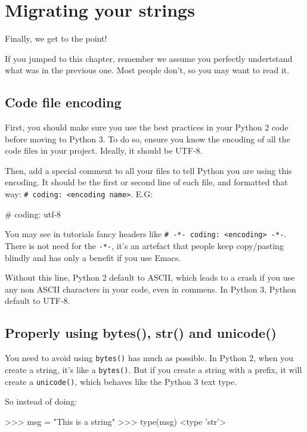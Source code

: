 
\chapter{Migrating your strings}

Finally, we get to the point!

If you jumped to this chapter, remember we assume you perfectly undertstand what was in the previous one. Most people don't, so you may want to read it.

\section{Code file encoding}

First, you should make sure you use the best practices in your Python 2 code before moving to Python 3. To do so, ensure you know the encoding of all the code files in your project. Ideally, it should be UTF-8.

Then, add a special comment to all your files to tell Python you are using this encoding. It should be the first or second line of each file, and formatted that way: \lstinline{# coding: <encoding name>}. E.G:

\begin{py2and3}
# coding: utf-8
\end{py2and3}

You may see in tutorials fancy headers like \lstinline{# -*- coding: <encoding> -*-}. There is not need for the \lstinline{-*-}, it's an artefact that people keep copy/pasting blindly and has only a benefit if you use Emacs.

Without this line, Python 2 default to ASCII, which leads to a crash if you use any non ASCII characters in your code, even in commens. In Python 3, Python default to UTF-8.

\section{Properly using bytes(), str() and unicode()}

You need to avoid using \lstinline{bytes()} has much as possible. In Python 2, when you create a string, it's like a \lstinline{bytes()}. But if you create a string with a  prefix, it will create a \lstinline{unicode()}, which behaves like the Python 3 text type.

So instead of doing:

\begin{py2}
>>> msg = "This is a string"
>>> type(msg)
<type 'str'>
\end{py2}

